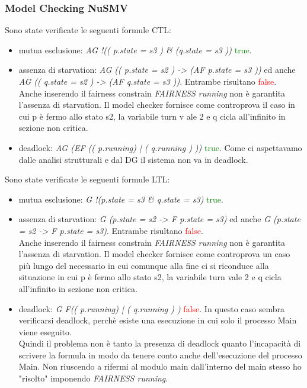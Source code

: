 \documentclass[a4paper]{article}
\begin{document}
\subsubsection{Model Checking NuSMV}
Sono state verificate le seguenti formule CTL:
\begin{itemize}
        \item mutua esclusione: \textit{AG !(( p.state = s3 ) \& (q.state = s3 ))} \textcolor{green}{true}.
        \item assenza di starvation: \textit{AG (( p.state = s2 ) -> (AF p.state = s3 ))} ed anche \textit{AG (( q.state = s2 ) -> (AF q.state = s3 ))}. Entrambe risultano \textcolor{red}{false}.\\
                Anche inserendo il fairness constrain \textit{FAIRNESS running} non è garantita l'assenza di starvation. Il model checker fornisce come controprova il caso in cui p è fermo allo stato s2, la variabile turn v
ale 2 e q cicla all'infinito in sezione non critica.
        \item deadlock: \textit{AG (EF (( p.running) | ( q.running ) ))} \textcolor{green}{true}. Come ci aspettavamo dalle analisi strutturali e dal DG il sistema non va in deadlock.
\end{itemize}
Sono state verificate le seguenti formule LTL:
\begin{itemize}
        \item mutua esclusione: \textit{G !(p.state = s3 \& q.state = s3)} \textcolor{green}{true}.
        \item assenza di starvation: \textit{G (p.state = s2 ->  F p.state = s3)} ed anche \textit{G (p.state = s2 ->  F p.state = s3)}. Entrambe risultano \textcolor{red}{false}.\\
		Anche inserendo il fairness constrain \textit{FAIRNESS running} non è garantita l'assenza di starvation. Il model checker fornisce come controprova un caso più lungo del necessario in cui comunque alla fine ci si riconduce alla situazione in cui p è fermo allo stato s2, la variabile turn vale 2 e q cicla all'infinito in sezione non critica.
        \item deadlock: \textit{G F(( p.running) | ( q.running ) )} \textcolor{red}{false}. In questo caso sembra verificarsi deadlock, perchè esiste una esecuzione in cui solo il processo Main viene eseguito.\\
		Quindi il problema non è tanto la presenza di deadlock quanto l'incapacità di scrivere la formula in modo da tenere conto anche dell'esecuzione del processo Main. Non riuscendo a rifermi al modulo main dall'interno del main stesso ho "risolto" imponendo \textit{FAIRNESS running}.
\end{itemize}
\end{document}
